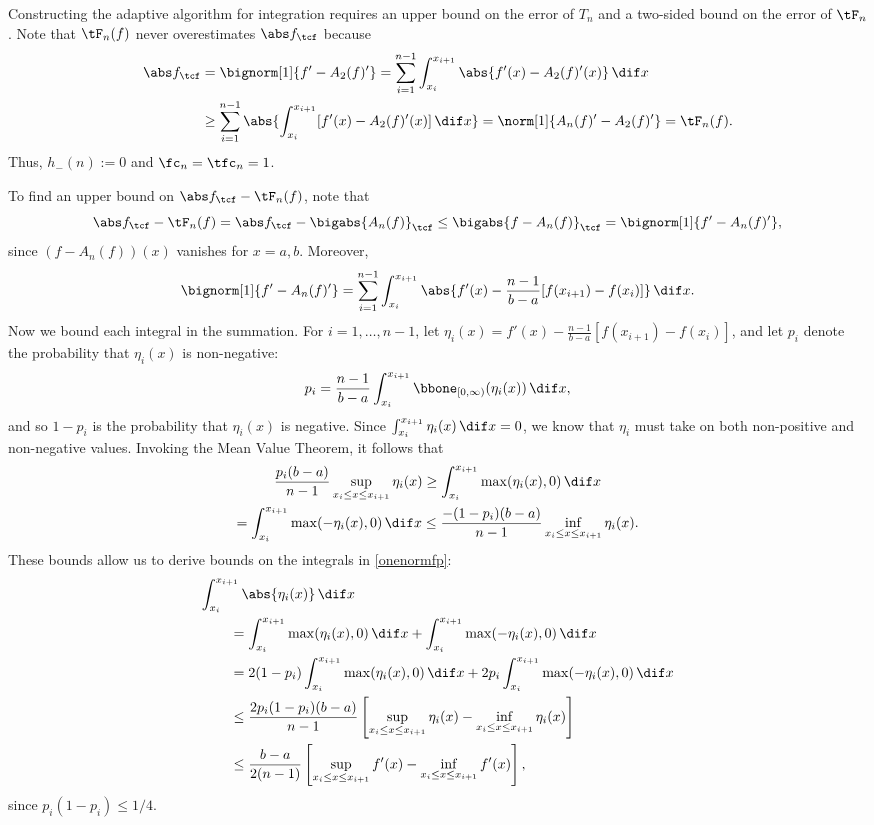 Constructing the adaptive algorithm for integration requires an upper bound on the error of $T_n$ and a two-sided bound on the error of $\tF_n$.  Note that $\tF_{n}(f)$ never overestimates $\Ftnorm{f}$ because
\begin{align*}
\Ftnorm{f} & = \bignorm[1]{f'-A_2(f)'}
= \sum_{i=1}^{n-1} \int_{x_i}^{x_{i+1}} \abs{f'(x) - A_2(f)'(x)} \, \dif x \\
& \ge \sum_{i=1}^{n-1} \abs{\int_{x_i}^{x_{i+1}} [f'(x) - A_2(f)'(x)] \, \dif x}=\norm[1]{A_n(f)'-A_2(f)'} = \tF_n(f).
\end{align*}
Thus, $h_{-}(n):=0$ and $\fc_n=\tfc_n=1$.

To find an upper bound on $\Ftnorm{f}-\tF_{n}(f)$, note that
\begin{equation*}
\Ftnorm{f} - \tF_{n}(f) = \Ftnorm{f} - \bigabs{A_n(f)}_{\tcf} \le \bigabs{f-A_n(f)}_{\tcf} = \bignorm[1]{f' -A_n(f)'},
\end{equation*}
since $(f-A_n(f))(x)$ vanishes for $x=a,b$.  Moreover,
\begin{equation} \label{onenormfp}
\bignorm[1]{f' -A_n(f)'} = \sum_{i=1}^{n-1} \int_{x_i}^{x_{i+1}} \abs{f'(x) -\frac{n-1}{b-a}[f(x_{i+1})-f(x_i)]} \, \dif x.
\end{equation}
Now we bound each integral in the summation.  For $i=1, \ldots, n-1$, let $\eta_i(x) = f'(x) -\frac{n-1}{b-a}[f(x_{i+1})-f(x_i)]$, and let $p_i$ denote the probability that $\eta_i(x)$ is non-negative:
\[
p_i = \frac{n-1}{b-a}\int_{x_i}^{x_{i+1}} \bbone_{[0,\infty)} (\eta_i(x)) \, \dif x,
\]
and so $1-p_i$ is the probability that $\eta_i(x)$ is negative.  Since $\int_{x_i}^{x_{i+1}} \eta_i(x) \, \dif x =0$, we know that $\eta_i$ must take on both non-positive and non-negative values.  Invoking the Mean Value Theorem, it follows that
\begin{multline*}
\frac{p_i(b-a)}{n-1} \sup_{x_i \le x \le x_{i+1}} \eta_i(x) \ge \int_{x_i}^{x_{i+1}} \max(\eta_i(x),0) \, \dif x \\
= \int_{x_i}^{x_{i+1}} \max(-\eta_i(x),0) \, \dif x \le \frac{-(1-p_i)(b-a)}{n-1} \inf_{x_i \le x \le x_{i+1}} \eta_i(x) .
\end{multline*}
These bounds allow us to derive bounds on the integrals in \eqref{onenormfp}:
\begin{align*}
\MoveEqLeft{\int_{x_i}^{x_{i+1}} \abs{\eta_i(x)} \, \dif x} \\
 &= \int_{x_i}^{x_{i+1}} \max(\eta_i(x),0) \, \dif x + \int_{x_i}^{x_{i+1}} \max(-\eta_i(x),0) \, \dif x\\
&=2(1-p_i) \int_{x_i}^{x_{i+1}} \max(\eta_i(x),0) \, \dif x + 2p_i\int_{x_i}^{x_{i+1}} \max(-\eta_i(x),0) \, \dif x\\
&\le \frac{2p_i(1-p_i)(b-a)}{n-1} \left[ \sup_{x_i \le x \le x_{i+1}} \eta_i(x) - \inf_{x_i \le x \le x_{i+1}} \eta_i(x) \right]\\
&\le\frac{b-a}{2(n-1)} \left[ \sup_{x_i \le x \le x_{i+1}} f'(x) - \inf_{x_i \le x \le x_{i+1}} f'(x) \right],
\end{align*}
since $p_i(1-p_i)\le 1/4$.

